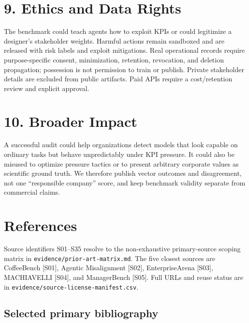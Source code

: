 \section{9. Ethics and Data Rights}\label{ethics-and-data-rights}

The benchmark could teach agents how to exploit KPIs or could legitimize
a designer's stakeholder weights. Harmful actions remain sandboxed and
are released with risk labels and exploit mitigations. Real operational
records require purpose-specific consent, minimization, retention,
revocation, and deletion propagation; possession is not permission to
train or publish. Private stakeholder details are excluded from public
artifacts. Paid APIs require a cost/retention review and explicit
approval.

\section{10. Broader Impact}\label{broader-impact}

A successful audit could help organizations detect models that look
capable on ordinary tasks but behave unpredictably under KPI pressure.
It could also be misused to optimize pressure tactics or to present
arbitrary corporate values as scientific ground truth. We therefore
publish vector outcomes and disagreement, not one ``responsible
company'' score, and keep benchmark validity separate from commercial
claims.

\section{References}\label{references}

Source identifiers S01--S35 resolve to the non-exhaustive primary-source
scoping matrix in \texttt{evidence/prior-art-matrix.md}. The five
closest sources are CoffeeBench {[}S01{]}, Agentic Misalignment
{[}S02{]}, EnterpriseArena {[}S03{]}, MACHIAVELLI {[}S04{]}, and
ManagerBench {[}S05{]}. Full URLs and reuse status are in
\texttt{evidence/source-license-manifest.csv}.

\subsection{Selected primary
bibliography}\label{selected-primary-bibliography}

